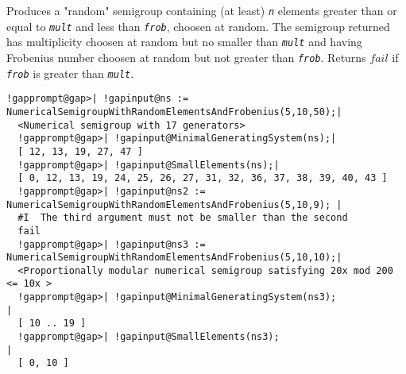 \documentclass[a4paper,11pt]{report}
\begin{document}
{{{ Produces a "random" semigroup containing (at least) \mbox{\texttt{\mdseries\slshape n}} elements greater than or equal to \mbox{\texttt{\mdseries\slshape mult}} and less than \mbox{\texttt{\mdseries\slshape frob}}, choosen at random. The semigroup returned has multiplicity choosen at random
but no smaller than \mbox{\texttt{\mdseries\slshape mult}} and having Frobenius number choosen at random but not greater than \mbox{\texttt{\mdseries\slshape frob}}. Returns $fail$ if \mbox{\texttt{\mdseries\slshape frob}} is greater than \mbox{\texttt{\mdseries\slshape mult}}. 
\begin{Verbatim}[commandchars=!@|,fontsize=\small,frame=single,label=Example]
  !gapprompt@gap>| !gapinput@ns := NumericalSemigroupWithRandomElementsAndFrobenius(5,10,50);|
  <Numerical semigroup with 17 generators>
  !gapprompt@gap>| !gapinput@MinimalGeneratingSystem(ns);|
  [ 12, 13, 19, 27, 47 ]
  !gapprompt@gap>| !gapinput@SmallElements(ns);|
  [ 0, 12, 13, 19, 24, 25, 26, 27, 31, 32, 36, 37, 38, 39, 40, 43 ]
  !gapprompt@gap>| !gapinput@ns2 := NumericalSemigroupWithRandomElementsAndFrobenius(5,10,9); |
  #I  The third argument must not be smaller than the second
  fail
  !gapprompt@gap>| !gapinput@ns3 := NumericalSemigroupWithRandomElementsAndFrobenius(5,10,10);|
  <Proportionally modular numerical semigroup satisfying 20x mod 200 <= 10x >
  !gapprompt@gap>| !gapinput@MinimalGeneratingSystem(ns3);                                    |
  [ 10 .. 19 ]
  !gapprompt@gap>| !gapinput@SmallElements(ns3);                                              |
  [ 0, 10 ]
\end{Verbatim}
 }

 }

 }
\end{document}
